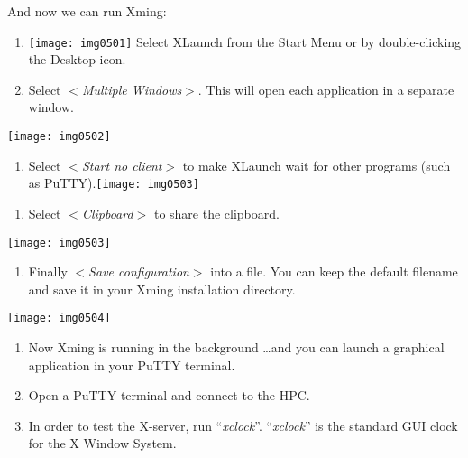 And now we can run Xming:

\begin{enumerate}
\item  \texttt{[image: img0501]}  Select XLaunch from the Start Menu or by double-clicking the Desktop icon.
\item  Select $<$\textit{Multiple Windows}$>$. This will open each application in a separate window.
\end{enumerate}

\texttt{[image: img0502]}

\begin{enumerate}
\item  Select $<$\textit{Start no client}$>$ to make XLaunch wait for other programs (such as PuTTY).\texttt{[image: img0503]}
\end{enumerate}

\begin{enumerate}
\item  Select $<$\textit{Clipboard}$>$ to share the clipboard.
\end{enumerate}

\texttt{[image: img0503]}

\begin{enumerate}
\item  Finally $<$\textit{Save configuration}$>$ into a file. You can keep the default filename and save it in your Xming installation directory.
\end{enumerate}

\texttt{[image: img0504]}

\begin{enumerate}
\item  Now Xming is running in the background \ldots and you can launch a graphical application in your PuTTY terminal.
\item  Open a PuTTY terminal and connect  to the HPC.
\item  In order to test the X-server, run ``\textit{xclock}''. ``\textit{xclock}'' is the standard GUI clock for the X Window System.
\end{enumerate}

\begin{prompt}
$ %
\end{prompt}

